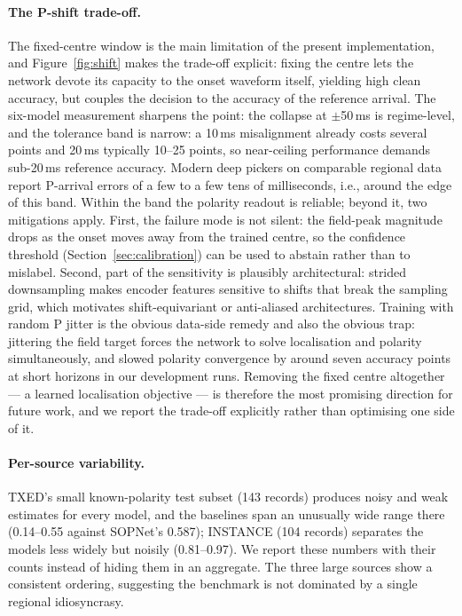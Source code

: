 \documentclass[11pt]{article}
\begin{document}
\paragraph{The P-shift trade-off.}
The fixed-centre window is the main limitation of the present implementation,
and Figure~\ref{fig:shift} makes the trade-off explicit: fixing the centre
lets the network devote its capacity to the onset waveform itself, yielding
high clean accuracy, but couples the decision to the accuracy of the
reference arrival. The six-model measurement sharpens the point: the collapse
at $\pm$50\,ms is regime-level, and the tolerance band is narrow: a
10\,ms misalignment already costs several points and 20\,ms typically
10--25 points, so near-ceiling performance demands sub-20\,ms reference
accuracy. Modern deep pickers on comparable regional data report P-arrival
errors of a few to a few tens of milliseconds, i.e., around the edge of this
band. Within the band the polarity readout is reliable; beyond it, two
mitigations apply. First, the failure mode is not silent: the field-peak magnitude drops
as the onset moves away from the trained centre, so the confidence threshold
(Section~\ref{sec:calibration}) can be used to abstain rather than to
mislabel. Second, part of the sensitivity is plausibly architectural: strided
downsampling makes encoder features sensitive to shifts that break the
sampling grid, which motivates shift-equivariant or anti-aliased
architectures. Training with random P jitter is the obvious data-side remedy
and also the obvious trap: jittering the field target forces the network to
solve localisation and polarity simultaneously, and slowed polarity
convergence by around seven accuracy points at short horizons in our
development runs. Removing the fixed centre altogether --- a learned
localisation objective --- is therefore the most promising direction for
future work, and we report the trade-off explicitly rather than optimising
one side of it.

\paragraph{Per-source variability.}
TXED's small known-polarity test subset (143 records) produces noisy and weak
estimates for every model, and the baselines span an unusually wide range
there (0.14--0.55 against SOPNet's 0.587); INSTANCE (104 records) separates
the models less widely but noisily (0.81--0.97). We report these numbers with
their counts instead of hiding them in an aggregate. The three large sources
show a consistent ordering, suggesting the benchmark is not dominated by a
single regional idiosyncrasy.
\end{document}
